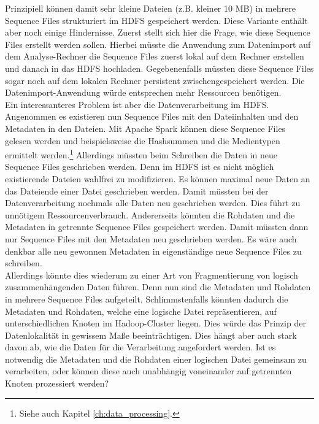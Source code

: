 \noindent
Prinzipiell können damit sehr kleine Dateien (z.B. kleiner 10 MB) in mehrere Sequence Files strukturiert im HDFS gespeichert werden. Diese Variante enthält aber noch einige Hindernisse. Zuerst stellt sich hier die Frage, wie diese Sequence Files erstellt werden sollen. Hierbei müsste die Anwendung zum Datenimport auf dem Analyse-Rechner die Sequence Files zuerst lokal auf dem Rechner erstellen und danach in das HDFS hochladen. Gegebenenfalls müssten diese Sequence Files sogar noch auf dem lokalen Rechner persistent zwischengespeichert werden. Die Datenimport-Anwendung würde entsprechen mehr Ressourcen benötigen.\\
Ein interessanteres Problem ist aber die Datenverarbeitung im HDFS. Angenommen es existieren nun Sequence Files mit den Dateiinhalten und den Metadaten in den Dateien. 
Mit Apache Spark können diese Sequence Files gelesen werden und beispielsweise die Hashsummen und die Medientypen ermittelt werden.\footnote{Siehe auch Kapitel \ref{ch:data_processing}.} Allerdings müssten beim Schreiben die Daten in neue Sequence Files geschrieben werden. Denn im HDFS ist es nicht möglich existierende Dateien wahlfrei zu modifizieren.\cite[S. 42]{expert_hadoop_admin} Es können maximal neue Daten an das Dateiende einer Datei geschrieben werden. Damit müssten bei der Datenverarbeitung nochmals alle Daten neu geschrieben werden. Dies führt zu unnötigem Ressourcenverbrauch. Andererseits könnten die Rohdaten und die Metadaten in getrennte Sequence Files gespeichert werden. Damit müssten dann nur Sequence Files mit den Metadaten neu geschrieben werden. Es wäre auch denkbar alle neu gewonnen Metadaten in eigenständige neue Sequence Files zu schreiben.\\ 
Allerdings könnte dies wiederum zu einer Art von Fragmentierung von logisch zusammenhängenden Daten führen. Denn nun sind die Metadaten und Rohdaten in mehrere Sequence Files aufgeteilt. Schlimmstenfalls könnten dadurch die Metadaten und Rohdaten, welche eine logische Datei repräsentieren, auf unterschiedlichen Knoten im Hadoop-Cluster liegen. Dies würde das Prinzip der Datenlokalität in gewissem Maße beeinträchtigen. Dies hängt aber auch stark davon ab, wie die Daten für die Verarbeitung angefordert werden. Ist es notwendig die Metadaten und die Rohdaten einer logischen Datei gemeinsam zu verarbeiten, oder können diese auch unabhängig voneinander auf getrennten Knoten prozessiert werden?\\

